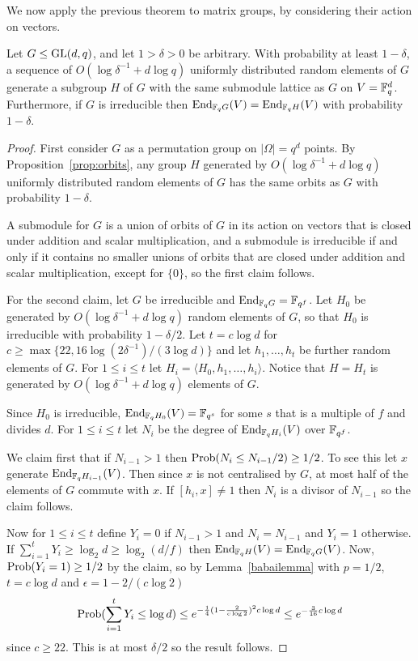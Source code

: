 We now apply the previous theorem to matrix groups, by considering their action on vectors. 

\begin{Theo} 
Let $G \leq \GL(d, q)$, and let $1 > \delta > 0$ 
be arbitrary. With probability at least 
$1 - \delta$,
a sequence of $O(\log \delta^{-1} + d \log q)$ 
uniformly distributed random elements of $G$ 
generate a subgroup $H$ of $G$ with the same 
submodule lattice as $G$ on $V = \mathbb{F}_q^d$.
Furthermore, if $G$ is irreducible then  $\End_{\F_qG}(V) = \End_{\F_qH}(V)$
with probability $1 - \delta$.
\end{Theo}

\begin{proof}
First consider $G$ as a permutation group 
on $|\Omega| = q^d$ points. By 
Proposition~\ref{prop:orbits}, any group 
$H$ generated by $O(\log \delta^{-1} + d \log q)$ 
uniformly distributed random elements of $G$ 
has the same orbits as $G$ with probability $1-\delta$. 

A submodule for $G$ is a union of orbits of 
$G$ in its action on vectors that is closed 
under addition and scalar multiplication, 
and a submodule is irreducible if and only 
if it contains no smaller unions of orbits 
that are closed under addition and scalar 
multiplication, except for $\{0\}$, so the first claim follows. 

For the second claim, let $G$ be irreducible and $\End_{\F_qG} = \F_{q^f}$.
Let $H_0$ be generated 
by $O(\log \delta^{-1} + d \log q)$ random 
elements of $G$, so that $H_0$ is irreducible 
with probability $1-\delta/2$. Let $t = c \log d$ 
for $c \geq \max\{22,  16\log (2\delta^{-1}) /(3 \log d)\}$
and let $h_1, \ldots, h_t$ be further random 
elements of $G$. For $1 \leq i \leq t$ let 
$H_i = \langle H_0, h_1, \ldots, h_i \rangle$. 
Notice that $H = H_t$ is generated by 
$O(\log \delta^{-1} + d \log q)$ elements of $G$. 


Since $H_0$ is irreducible,  $\End_{\F_qH_0}(V) = \F_{q^s}$ for some 
$s$ that is a multiple of $f$ and divides $d$. 
For $1 \leq i \leq t$ let $N_i$ be the
 degree of $\End_{\F_q H_i}(V)$ over $\mathbb{F}_{q^f}$. 

We claim first that if $N_{i-1} > 1$ then 
$\Pro(N_i \leq N_{i-1}/2) \geq 1/2$.  To 
see this let $x$ generate
 $\End_{\F_q H_{i-1}}(V)$. Then since 
$x$ is not centralised by  $G$, at 
most half of the elements of $G$ commute 
with $x$. If $[h_i, x] \neq 1$ 
then $N_i$ is a divisor of $N_{i-1}$ so the claim follows. 

Now for $1 \leq i \leq t$ define $Y_i = 0$ 
if $N_{i-1} > 1$ and $N_i = N_{i-1}$ and 
$Y_i = 1$ otherwise. If 
$\sum_{i = 1}^t Y_i \geq \log_2 d \geq \log_2 (d/f)$ 
then $\End_{\F_q H}(V) = \End_{\F_q G}(V)$. Now, 
$\Pro(Y_i = 1) \geq 1/2$ by the claim, so 
by Lemma~\ref{babailemma} with $p = 1/2$, $t = c \log d$ and $\epsilon = 1 - 2/(c \log 2)$ %
 $$\Pro(\sum_{i = 1}^t Y_i \leq \log d) \leq e^{-\frac{1}{4}(1- \frac{2}{c \log 2})^2 c \log d} \leq e^{-\frac{3}{16}c \log d}$$ since $c \geq 22$. 
This is at most $\delta/2$ so the result follows. 
\end{proof}


